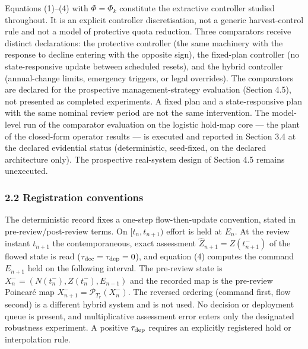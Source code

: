 \documentclass[11pt]{article}
\begin{document}
Equations (1)--(4) with \(\Phi=\Phi_k\) constitute the extractive
controller studied throughout. It is an explicit controller
discretisation, not a generic harvest-control rule and not a model of
protective quota reduction. Three comparators receive distinct
declarations: the protective controller (the same machinery with the
response to decline entering with the opposite sign), the fixed-plan
controller (no state-responsive update between scheduled resets), and
the hybrid controller (annual-change limits, emergency triggers, or
legal overrides). The comparators are declared for the prospective
management-strategy evaluation (Section 4.5), not presented as completed
experiments. A fixed plan and a state-responsive plan with the same
nominal review period are not the same intervention. The model-level run
of the comparator evaluation on the logistic hold-map core --- the plant
of the closed-form operator results --- is executed and reported in
Section 3.4 at the declared evidential status (deterministic,
seed-fixed, on the declared architecture only). The prospective
real-system design of Section 4.5 remains unexecuted.

\subsubsection{2.2 Registration
conventions}\label{registration-conventions}

The deterministic record fixes a one-step flow-then-update convention,
stated in pre-review/post-review terms. On \([t_n, t_{n+1})\) effort is
held at \(E_n\). At the review instant \(t_{n+1}\) the contemporaneous,
exact assessment \(\widehat Z_{n+1} = Z(t_{n+1}^-)\) of the flowed state
is read (\(\tau_{\rm dec}=\tau_{\rm dep}=0\)), and equation (4) computes
the command \(E_{n+1}\) held on the following interval. The pre-review
state is \(X_n^-=(N(t_n^-),Z(t_n^-),E_{n-1})\) and the recorded map is
the pre-review Poincar\'e map \(X_{n+1}^-=\mathcal P_{T_r}(X_n^-)\). The
reversed ordering (command first, flow second) is a different hybrid
system and is not used. No decision or deployment queue is present, and
multiplicative assessment error enters only the designated robustness
experiment. A positive \(\tau_{\rm dep}\) requires an explicitly
registered hold or interpolation rule.
\end{document}
